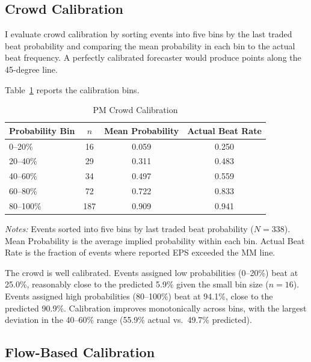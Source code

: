 \documentclass[11pt]{article}
\begin{document}
\subsection{Crowd Calibration}

I evaluate crowd calibration by sorting events into five bins by the last traded beat probability and comparing the mean probability in each bin to the actual beat frequency. A perfectly calibrated forecaster would produce points along the 45-degree line.

Table~\ref{tab:calibration} reports the calibration bins.

\begin{table}[htbp]
\centering
\begin{threeparttable}
\caption{PM Crowd Calibration}
\label{tab:calibration}
\begin{tabular}{lccc}
\toprule
Probability Bin & $n$ & Mean Probability & Actual Beat Rate \\
\midrule
0--20\% & 16 & 0.059 & 0.250 \\
20--40\% & 29 & 0.311 & 0.483 \\
40--60\% & 34 & 0.497 & 0.559 \\
60--80\% & 72 & 0.722 & 0.833 \\
80--100\% & 187 & 0.909 & 0.941 \\
\bottomrule
\end{tabular}
\begin{tablenotes}
\small
\item \textit{Notes:} Events sorted into five bins by last traded beat probability ($N = 338$). Mean Probability is the average implied probability within each bin. Actual Beat Rate is the fraction of events where reported EPS exceeded the MM line.
\end{tablenotes}
\end{threeparttable}
\end{table}

The crowd is well calibrated. Events assigned low probabilities (0--20\%) beat at 25.0\%, reasonably close to the predicted 5.9\% given the small bin size ($n = 16$). Events assigned high probabilities (80--100\%) beat at 94.1\%, close to the predicted 90.9\%. Calibration improves monotonically across bins, with the largest deviation in the 40--60\% range (55.9\% actual vs.\ 49.7\% predicted).

\subsection{Flow-Based Calibration}
\end{document}

